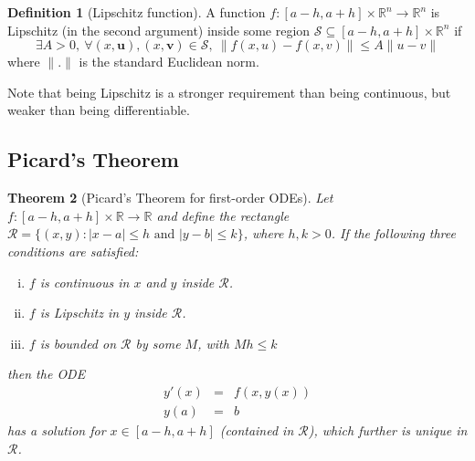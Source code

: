\documentclass[10pt,fleqn]{article}
\newcommand{\reals}{\mathbb{R}}
\newcommand{\rect}{\mathcal{R}}
\newcommand{\vc}[1]{\boldsymbol{#1}}
\theoremstyle{definition} \newtheorem{defn}{Definition}[section]
\theoremstyle{plain}      \newtheorem{thm}[defn]{Theorem}
\theoremstyle{plain}      \newtheorem{lem}[defn]{Lemma}
\theoremstyle{definition} \newtheorem{prop}[defn]{Proposition}
\theoremstyle{definition} \newtheorem{cor}[defn]{Corollary}
\theoremstyle{definition} \newtheorem{ex}[defn]{Example}
\theoremstyle{definition} \newtheorem{rem}[defn]{Remark}
\begin{document}
\begin{defn}[Lipschitz function]\label{lip-def}
    A function $f:[a-h,a+h]\times\reals^n\to\reals^{n}$ is Lipschitz (in the second argument) inside some region $\mathcal{S}\subseteq[a-h,a+h]\times\reals^n$ if
    \[
        \exists A>0,~
        \forall (x,\vc{u}),(x,\vc{v})\in\mathcal{S},~
        \|f(x,u)-f(x,v)\|\leq
        A\|u-v\|
    \]
    where $\|.\|$ is the standard Euclidean norm.

    Note that being Lipschitz is a stronger requirement than being continuous, but weaker than being differentiable.
\end{defn}


\subsection{Picard's Theorem}

\begin{thm}[Picard's Theorem for first-order ODEs]
    Let $f:[a-h,a+h]\times\reals\to\reals$ and define the rectangle $\rect=\{(x,y)\colon|x-a|\leq h\text{ and }|y-b|\leq k\}$, where $h,k>0$.
    If the following three conditions are satisfied:
    \begin{enumerate}[(i)]
        \item $f$ is continuous in $x$ and $y$ inside $\rect$.
        \item $f$ is Lipschitz in $y$ inside $\rect$.
        \item $f$ is bounded on $\rect$ by some $M$, with $Mh\leq k$
    \end{enumerate}
    then the ODE
    \[
        \begin{array}{rcl}
            y'(x) &=& f(x,y(x))\\
            y(a) &=& b
        \end{array}
    \]
    has a solution for $x\in[a-h,a+h]$ (contained in $\rect$), which further is unique in $\rect$.
\end{thm}
\end{document}
